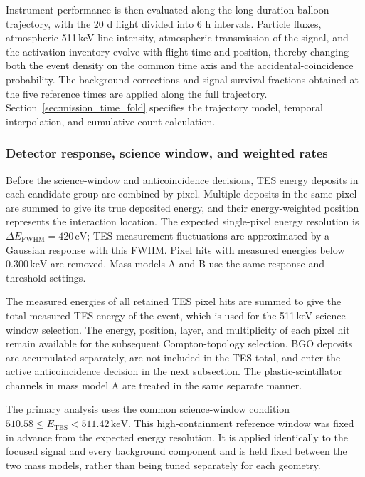 \documentclass[11pt]{article}
\newcommand{\keV}{\ensuremath{\,\mathrm{keV}}}
\begin{document}
Instrument performance is then evaluated along the long-duration balloon
trajectory, with the 20 d flight divided into 6 h intervals. Particle fluxes,
atmospheric 511\,keV line intensity, atmospheric
transmission of the signal, and the activation inventory evolve with flight
time and position, thereby changing both the event density on the common time
axis and the accidental-coincidence probability. The background corrections
and signal-survival fractions obtained at the five reference times are applied
along the full trajectory. Section~\ref{sec:mission_time_fold} specifies the
trajectory model, temporal interpolation, and cumulative-count calculation.

\subsubsection{Detector response, science window, and weighted rates}
\label{subsec:detector_response}

Before the science-window and anticoincidence decisions, TES energy deposits in
each candidate group are combined by pixel. Multiple deposits in the same pixel
are summed to give its true deposited energy, and their energy-weighted position
represents the interaction location. The expected single-pixel energy resolution
is $\Delta E_{\mathrm{FWHM}}=420\,\mathrm{eV}$; TES measurement fluctuations are
approximated by a Gaussian response with this FWHM. Pixel hits with measured
energies below $0.300\keV$ are removed. Mass models A and B use the same response
and threshold settings.

The measured energies of all retained TES pixel hits are summed to give the total
measured TES energy of the event, which is used for the 511\,keV science-window
selection. The energy, position, layer, and multiplicity of each pixel hit remain
available for the subsequent Compton-topology selection. BGO deposits are
accumulated separately, are not included in the TES total, and enter the active
anticoincidence decision in the next subsection. The plastic-scintillator channels
in mass model A are treated in the same separate manner.

The primary analysis uses the common science-window condition
$510.58\leq E_{\mathrm{TES}}<511.42\keV$. This
high-containment reference window was fixed in advance from the expected energy
resolution. It is applied identically to the focused signal and every background
component and is held fixed between the two mass models, rather than being tuned
separately for each geometry.
\end{document}
